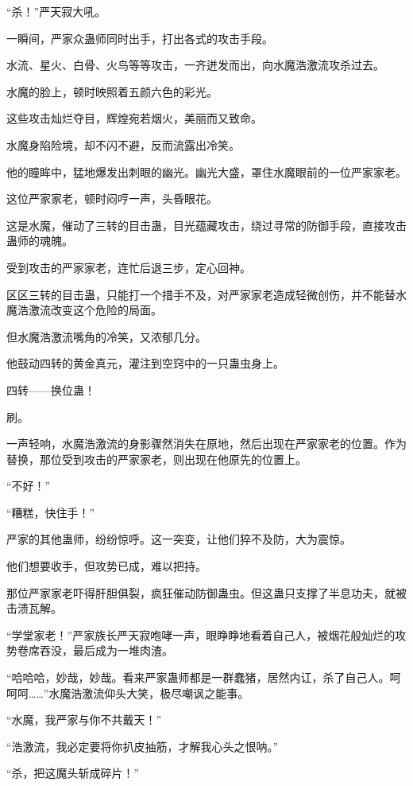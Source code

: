 
\begin{this_body}

“杀！”严天寂大吼。

一瞬间，严家众蛊师同时出手，打出各式的攻击手段。

水流、星火、白骨、火鸟等等攻击，一齐迸发而出，向水魔浩激流攻杀过去。

水魔的脸上，顿时映照着五颜六色的彩光。

这些攻击灿烂夺目，辉煌宛若烟火，美丽而又致命。

水魔身陷险境，却不闪不避，反而流露出冷笑。

他的瞳眸中，猛地爆发出刺眼的幽光。幽光大盛，罩住水魔眼前的一位严家家老。

这位严家家老，顿时闷哼一声，头昏眼花。

这是水魔，催动了三转的目击蛊，目光蕴藏攻击，绕过寻常的防御手段，直接攻击蛊师的魂魄。

受到攻击的严家家老，连忙后退三步，定心回神。

区区三转的目击蛊，只能打一个措手不及，对严家家老造成轻微创伤，并不能替水魔浩激流改变这个危险的局面。

但水魔浩激流嘴角的冷笑，又浓郁几分。

他鼓动四转的黄金真元，灌注到空窍中的一只蛊虫身上。

四转——换位蛊！

刷。

一声轻响，水魔浩激流的身影骤然消失在原地，然后出现在严家家老的位置。作为替换，那位受到攻击的严家家老，则出现在他原先的位置上。

“不好！”

“糟糕，快住手！”

严家的其他蛊师，纷纷惊呼。这一突变，让他们猝不及防，大为震惊。

他们想要收手，但攻势已成，难以把持。

那位严家家老吓得肝胆俱裂，疯狂催动防御蛊虫。但这蛊只支撑了半息功夫，就被击溃瓦解。

“学堂家老！”严家族长严天寂咆哮一声，眼睁睁地看着自己人，被烟花般灿烂的攻势卷席吞没，最后成为一堆肉渣。

“哈哈哈，妙哉，妙哉。看来严家蛊师都是一群蠢猪，居然内讧，杀了自己人。呵呵呵……”水魔浩激流仰头大笑，极尽嘲讽之能事。

“水魔，我严家与你不共戴天！”

“浩激流，我必定要将你扒皮抽筋，才解我心头之恨呐。”

“杀，把这魔头斩成碎片！”


\end{this_body}
